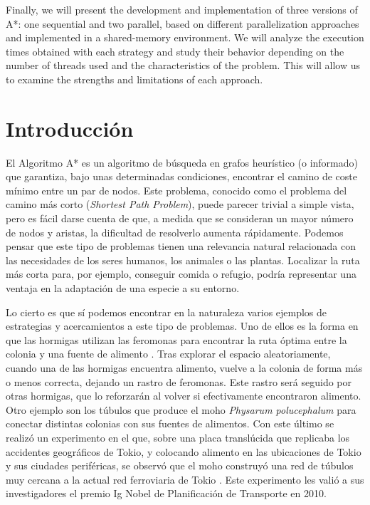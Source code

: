 \documentclass[a4paper,12pt]{article}
\begin{document}
Finally, we will present the development and implementation of three versions of A*: one sequential and two parallel, based on different parallelization approaches and implemented in a shared-memory environment. We will analyze the execution times obtained with each strategy and study their behavior depending on the number of threads used and the characteristics of the problem. This will allow us to examine the strengths and limitations of each approach.

\newpage

\tableofcontents
\thispagestyle{empty}

\newpage

\section{Introducción} \label{sec:introduccion}

El Algoritmo A* es un algoritmo de búsqueda en grafos heurístico (o informado) que garantiza, bajo unas determinadas condiciones, encontrar el camino de coste mínimo entre un par de nodos. Este problema, conocido como el problema del camino más corto (\textit{Shortest Path Problem}), puede parecer trivial a simple vista, pero es fácil darse cuenta de que, a medida que se consideran un mayor número de nodos y aristas, la dificultad de resolverlo aumenta rápidamente. Podemos pensar que este tipo de problemas tienen una relevancia natural relacionada con las necesidades de los seres humanos, los animales o las plantas. Localizar la ruta más corta para, por ejemplo, conseguir comida o refugio, podría representar una ventaja en la adaptación de una especie a su entorno.

Lo cierto es que sí podemos encontrar en la naturaleza varios ejemplos de estrategias y acercamientos a este tipo de problemas. Uno de ellos es la forma en que las hormigas utilizan las feromonas para encontrar la ruta óptima entre la colonia y una fuente de alimento \cite{colorni1991distributed}. Tras explorar el espacio aleatoriamente, cuando una de las hormigas encuentra alimento, vuelve a la colonia de forma más o menos correcta, dejando un rastro de feromonas. Este rastro será seguido por otras hormigas, que lo reforzarán al volver si efectivamente encontraron alimento. Otro ejemplo son los túbulos que produce el moho \textit{Physarum polucephalum} para conectar distintas colonias con sus fuentes de alimentos. Con este último se realizó un experimento en el que, sobre una placa translúcida que replicaba los accidentes geográficos de Tokio, y colocando alimento en las ubicaciones de Tokio y sus ciudades periféricas, se observó que el moho construyó una red de túbulos muy cercana a la actual red ferroviaria de Tokio \cite{tero2010rules}. Este experimento les valió a sus investigadores el premio Ig Nobel de Planificación de Transporte en 2010.
\end{document}
